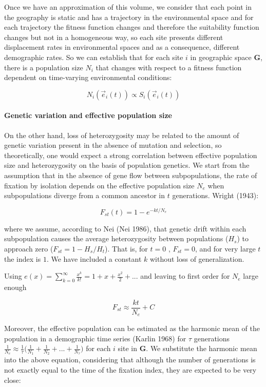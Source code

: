 \documentclass[
]{article}
\begin{document}
Once we have an approximation of this volume, we consider that each
point in the geography is static and has a trajectory in the
environmental space and for each trajectory the fitness function changes
and therefore the suitability function changes but not in a homogeneous
way, so each site presents different displacement rates in environmental
spaces and as a consequence, different demographic rates. So we can
establish that for each site \(i\) in geographic space \(\mathbf{G}\),
there is a population size \(N_i\) that changes with respect to a
fitness function dependent on time-varying environmental conditions:

\[
N_i(\vec{e}_i(t)) \propto  S_i(\vec{e}_i(t))
\]

\hypertarget{genetic-variation-and-effective-population-size}{%
\paragraph{Genetic variation and effective population
size}\label{genetic-variation-and-effective-population-size}}

On the other hand, loss of heterozygosity may be related to the amount
of genetic variation present in the absence of mutation and selection,
so theoretically, one would expect a strong correlation between
effective population size and heterozygosity on the basis of population
genetics. We start from the assumption that in the absence of gene flow
between subpopulations, the rate of fixation by isolation depends on the
effective population size \(N_e\) when subpopulations diverge from a
common ancestor in \(t\) generations. Wright (1943):

\[
F_{st}(t) = 1 - e^{-kt/N_e } 
\]

where we assume, according to Nei (Nei 1986), that genetic drift within
each subpopulation causes the average heterozygosity between populations
(\(H_s\)) to approach zero (\(F_{st} = 1 - H_s/H_t\)). That is, for
\(t=0\) , \(F_{st} = 0\), and for very large \(t\) the index is \(1\). We
have included a constant \(k\) without loss of generalization.

Using
\(e(x) = \sum_{k=0}^{\infty} \frac{x^k}{k!} = 1 + x + \frac{x^2}{2} + ...\)
and leaving to first order for \(N_e\) large enough

\[
F_{st} \approx \frac{kt}{N_e} + C
\]

Moreover, the effective population can be estimated as the harmonic mean
of the population in a demographic time series (Karlin 1968) for
\(\tau\) generations
\(\frac{1}{N_e} \approx \frac{1}{\tau}\Big({\frac{1}{N_1} + \frac{1}{N_2} + ... + \frac{1}{N_\tau} } \Big)\)
for each \(i\) site in \(\mathbf{G}\). We substitute the harmonic mean
into the above equation, considering that although the number of
generations is not exactly equal to the time of the fixation index, they
are expected to be very close:
\end{document}
